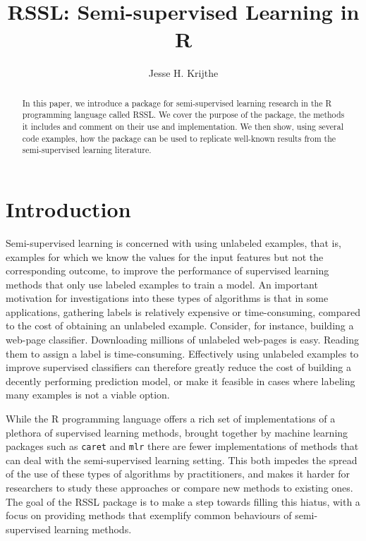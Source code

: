 \documentclass[runningheads,a4paper]{llncs}\usepackage[]{graphicx}\usepackage[]{color}
\begin{document}
\title{RSSL: Semi-supervised Learning in R}

\author{Jesse H. Krijthe}


			
\maketitle

\begin{abstract}
In this paper, we introduce a package for semi-supervised learning research in the R programming language called RSSL. We cover the purpose of the package, the methods it includes and comment on their use and implementation. We then show, using several code examples, how the package can be used to replicate well-known results from the semi-supervised learning literature.
\end{abstract}




\section{Introduction}
Semi-supervised learning is concerned with using unlabeled examples, that is, examples for which we know the values for the input features but not the corresponding outcome, to improve the performance of supervised learning methods that only use labeled examples to train a model. An important motivation for investigations into these types of algorithms is that in some applications, gathering labels is relatively expensive or time-consuming, compared to the cost of obtaining an unlabeled example. Consider, for instance, building a web-page classifier. Downloading millions of unlabeled web-pages is easy. Reading them to assign a label is time-consuming. Effectively using unlabeled examples to improve supervised classifiers can therefore greatly reduce the cost of building a decently performing prediction model, or make it feasible in cases where labeling many examples is not a viable option.

While the R programming language \cite{RCoreTeam2016} offers a rich set of implementations of a plethora of supervised learning methods, brought together by machine learning packages such as \texttt{caret} and \texttt{mlr} there are fewer implementations of methods that can deal with the semi-supervised learning setting. This both impedes the spread of the use of these types of algorithms by practitioners, and makes it harder for researchers to study these approaches or compare new methods to existing ones.  The goal of the RSSL package is to make a step towards filling this hiatus, with a focus on providing methods that exemplify common behaviours of semi-supervised learning methods.
\end{document}

